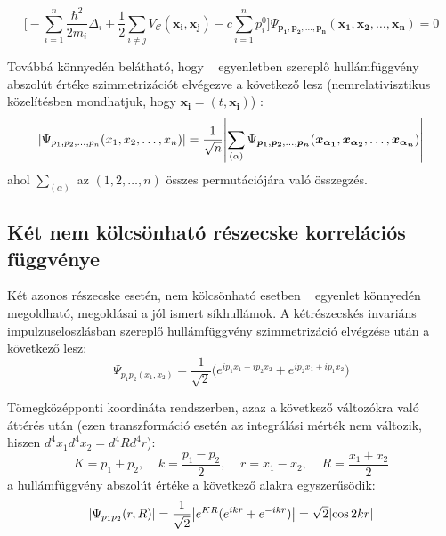 \documentclass[10pt,a4paper]{article}
\numberwithin{equation}{subsection}
\numberwithin{figure}{section}
\begin{document}
\begin{equation}
\Bigg[-\sum_{i=1}^{n}\frac{\hbar^2}{2m_i}\Delta_i + \frac{1}{2}\sum_{i\neq j} V_\mathcal{C}(\bm{x_i},\bm{x_j})  
 - c\sum_{i=1}^n p_i^0
 \Bigg]\Psi_{\bm{p_1}, \bm{p_2}, \dots, \bm{p_n}}(\bm{x_1}, \bm{x_2}, \dots, \bm{x_n}) = 0
\end{equation}

Továbbá könnyedén belátható, hogy ~ egyenletben szereplő hullámfüggvény abszolút értéke szimmetrizációt elvégezve a következő lesz  (nemrelativisztikus közelítésben mondhatjuk, hogy $\bm{x_i} = (t,\bm{x_i})$) :
\begin{equation}
\abs{\Psi_{{p_1},{p_2}, \dots,{p_n}}({x_1}, {x_2}, \dots, {x_n})} = \frac{1}{\sqrt{n}}\abs{\sum_{(\alpha)}\Psi_{\bm{p_1}, \bm{p_2}, \dots, \bm{p_n}}(\bm{x_{\alpha_1}}, \bm{x_{\alpha_2}}, \dots, \bm{x_{\alpha_n}})}
\label{eq:Psin}
\end{equation}
ahol $\sum_{(\alpha)}$ az $(1,2,\dots,n)$ összes permutációjára való összegzés.


\subsection{Két nem kölcsönható részecske korrelációs függvénye}

Két azonos részecske esetén, nem kölcsönható esetben ~ egyenlet könnyedén megoldható, megoldásai a jól
ismert síkhullámok. A kétrészecskés invariáns impulzuseloszlásban szereplő hullámfüggvény szimmetrizáció
elvégzése után a következő lesz:
\begin{equation}
\Psi_{{p_1}{p_2}({x_1},{x_2})} = \frac{1}{\sqrt{2}}\big({e^{{ip_1x_1}+i{p_2x_2}}+e^{i{p_2x_1}+i{p_1x_2}}}\big)
\end{equation}

Tömegközépponti koordináta rendszerben, azaz a következő változókra való áttérés után (ezen transzformáció esetén az integrálási mérték nem változik, hiszen $d^4x_1d^4x_2=d^4Rd^4r$):
\begin{equation}
{K}={p_1+p_2},\;\;\;\;{k}=\frac{{p_1-p_2}}{2},\;\;\;\;{r}={x_1-x_2},\;\;\;\;{R}=\frac{{x_1+x_2}}{2}
\label{eq:CMF}
\end{equation}
\noindent
a hullámfüggvény abszolút értéke a következő alakra egyszerűsödik:
\begin{equation}
\abs{\Psi_{{p_1}{p_2}}({r},{R})} = \frac{1}{\sqrt{2}}\abs{e^{{KR}}(e^{i{kr}}+e^{-i{kr}})}=\sqrt{2}\abs{\cos{2{kr}}}
\end{equation}
\end{document}
